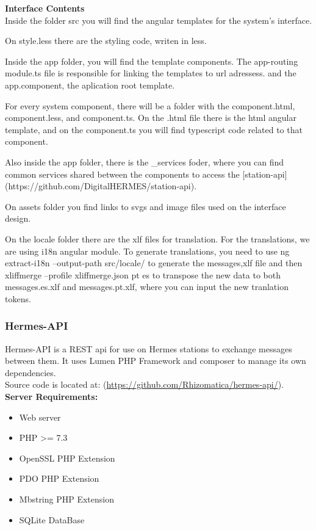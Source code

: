 \textbf{Interface Contents}\\
Inside the folder src you will find the angular templates for the system's interface.

On style.less there are the styling code, writen in less.

Inside the app folder, you will find the template components. The app-routing module.ts file is responsible for linking the templates to url adressess. and the app.component, the aplication root template.

For every system component, there will be a folder with the component.html, component.less, and component.ts. On the .html file there is the html angular template, and on the component.ts you will find typescript code related to that component.

Also inside the app folder, there is the \_services foder, where you can find common services shared between the components to access the [station-api] (https://github.com/DigitalHERMES/station-api).

On assets folder you find links to svgs and image files used on the interface design.

On the locale folder there are the xlf files for translation. For the translations, we are using i18n angular module. To generate translations, you need to use ng extract-i18n --output-path src/locale/ to generate the messages,xlf file and then xliffmerge --profile xliffmerge.json pt es to transpose the new data to both messages.es.xlf and messages.pt.xlf, where you can input the new tranlation tokens.

\subsubsection{Hermes-API}
Hermes-API is a REST api for use on Hermes stations to exchange messages between them.
It uses Lumen PHP Framework and composer to manage its own dependencies.\\

Source code is located at:
(\url{https://github.com/Rhizomatica/hermes-api/}).\\

\textbf{Server Requirements:}
\begin{itemize}
  \item Web server
  \item PHP >= 7.3
  \item OpenSSL PHP Extension
  \item PDO PHP Extension
  \item Mbstring PHP Extension
  \item SQLite DataBase\\
\end{itemize}

